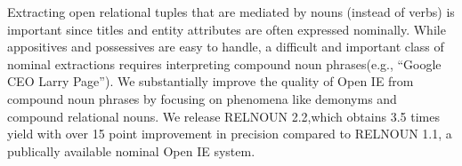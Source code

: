 Extracting open relational tuples that are mediated by nouns (instead of verbs) is important since titles and entity attributes are often expressed nominally. While appositives and possessives are easy to handle, a difficult and important class of nominal extractions requires interpreting compound noun phrases(e.g., ``Google CEO Larry Page''). We substantially improve the quality of Open IE from compound noun phrases by focusing on phenomena like demonyms and compound relational nouns. We release RELNOUN 2.2,which obtains 3.5 times yield with over 15 point improvement in precision compared to RELNOUN 1.1, a publically available nominal Open IE system.

